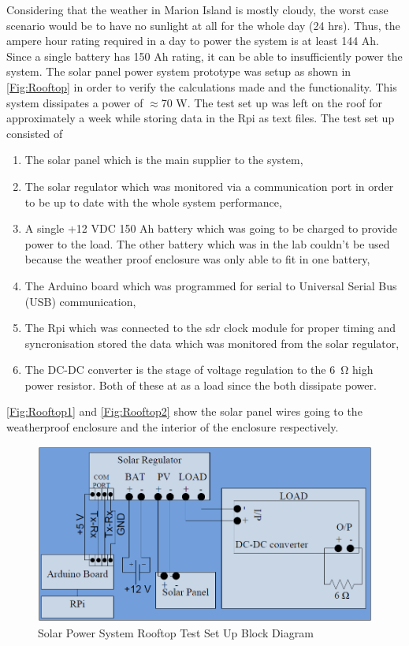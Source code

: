 \documentclass[12pt,a4paper]{report}
\begin{document}
Considering that the weather in Marion Island is mostly cloudy, the worst case scenario would be to have no sunlight at all for the whole day (24 hrs). Thus, the ampere hour rating required in a day to power the system is at least 144 Ah. Since a single battery has 150 Ah rating, it can be able to insufficiently power the system. The solar panel power system prototype was setup as shown in \autoref{Fig:Rooftop} in order to verify the calculations made and the functionality. This system dissipates a power of $\approx$70 W. The test set up was left on the roof for approximately a week while storing data in the Rpi as text files. The test set up consisted of 

\begin{enumerate}
	\item The solar panel which is the main supplier to the system,
	\item The solar regulator which was monitored via a communication port in order to be up to date with the whole system performance,
	\item A single +12 VDC 150 Ah battery which was going to be charged to provide power to the load. The other battery which was in the lab couldn't be used because the weather proof enclosure was only able to fit in one battery,
	\item The Arduino board which was programmed for serial to Universal Serial Bus (USB) communication,
	\item The Rpi which was connected to the sdr clock module for proper timing and syncronisation stored the data which was monitored from the solar regulator,
	\item The DC-DC converter is the stage of voltage regulation to the \SI{6}{\ohm} high power resistor. Both of these at as a load since the both dissipate power.
\end{enumerate}

\autoref{Fig:Rooftop1} and \autoref{Fig:Rooftop2} show the solar panel wires going to the weatherproof enclosure and the interior of the enclosure respectively.
 
\begin{figure}[h!]
	\begin{center}
		\includegraphics[width=0.8\linewidth]{Figures/Rooftop.PNG}
		\caption{Solar Power System Rooftop Test Set Up Block Diagram}
		\label{Fig:Rooftop}
	\end{center}
\end{figure}
\end{document}
